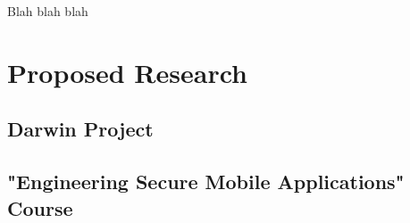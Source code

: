



Blah blah blah

\section{Proposed Research}


\subsection{Darwin Project} %

















\subsection{"Engineering Secure Mobile Applications" Course}




